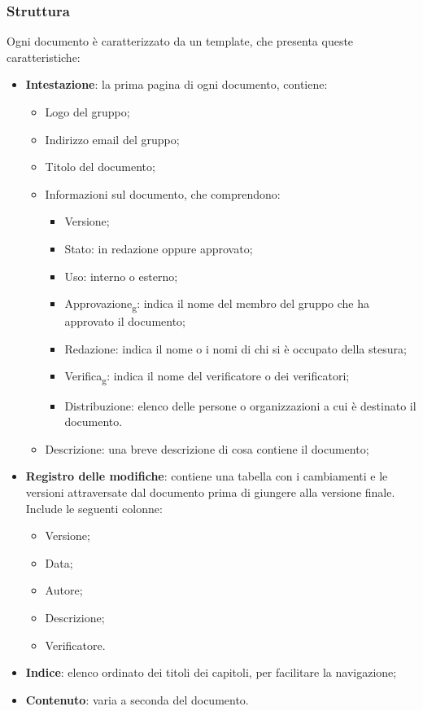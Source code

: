 \subsubsection{Struttura}
Ogni documento è caratterizzato da un template, che presenta queste
caratteristiche:
\begin{itemize}
      \item \textbf{Intestazione}: la prima pagina di ogni documento, contiene:
            \begin{itemize}
                  \item Logo del gruppo;
                  \item Indirizzo email del gruppo;
                  \item Titolo del documento;
                  \item Informazioni sul documento, che comprendono:
                        \begin{itemize}
                              \item Versione;
                              \item Stato: in redazione oppure approvato;
                              \item Uso: interno o esterno;
                              \item Approvazione\textsubscript{g}: indica il nome del membro del gruppo che ha
                                    approvato il documento;
                              \item Redazione: indica il nome o i nomi di chi si è occupato della stesura;
                              \item Verifica\textsubscript{g}: indica il nome del verificatore o dei verificatori;
                              \item Distribuzione: elenco delle persone o organizzazioni a cui è destinato il
                                    documento.
                        \end{itemize}
                  \item Descrizione: una breve descrizione di cosa contiene il documento;
            \end{itemize}
      \item \textbf{Registro delle modifiche}: contiene una tabella con i cambiamenti e le versioni
            attraversate dal documento prima di giungere alla versione finale. Include le seguenti colonne:
            \begin{itemize}
                  \item Versione;
                  \item Data;
                  \item Autore;
                  \item Descrizione;
                  \item Verificatore.
            \end{itemize}
      \item \textbf{Indice}: elenco ordinato dei titoli dei capitoli, per facilitare la navigazione;
      \item \textbf{Contenuto}: varia a seconda del documento.
\end{itemize}

